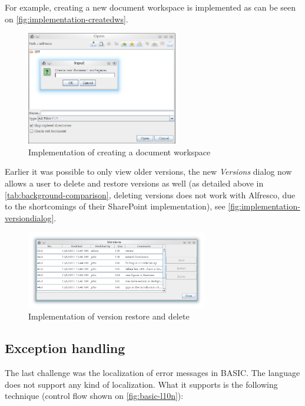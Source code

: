 For example, creating a new document workspace is implemented as can be seen on
\autoref{fig:implementation-createdws}.

\begin{figure}[H]
\centering
\includegraphics[width=250px,keepaspectratio]{implementation-createdws.png}
\caption{Implementation of creating a document workspace}
\label{fig:implementation-createdws}
\end{figure}

Earlier it was possible to only view older versions, the new \emph{Versions}
dialog now allows a user to delete and restore versions as well (as detailed
above in \autoref{tab:background-comparison}, deleting versions does not work
with Alfresco, due to the shortcomings of their SharePoint implementation), see
\autoref{fig:implementation-versiondialog}.

\begin{figure}[H]
\centering
\includegraphics[width=300px,keepaspectratio]{implementation-versiondialog.png}
\caption{Implementation of version restore and delete}
\label{fig:implementation-versiondialog}
\end{figure}

\subsection{Exception handling}

The last challenge was the localization of error messages in BASIC. The
language does not support any kind of localization. What it supports is the
following technique (control flow shown on \autoref{fig:basic-l10n}):

